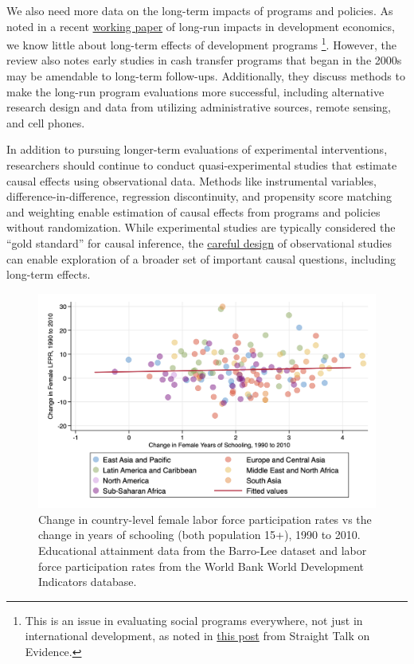 \documentclass[11pt]{article}
\begin{document}

We also need more data on the long-term impacts of programs and policies. As noted in a recent \href{https://www.nber.org/papers/w25356}{working paper} of long-run impacts in development economics, we know little about long-term effects of development programs \footnote{This is an issue in evaluating social programs everywhere, not just in international development, as noted in  \href{texthttps://www.straighttalkonevidence.org/2019/04/03/beware-the-pitfalls-of-short-term-program-effects-they-often-fade/}{this post} from Straight Talk on Evidence.}. However, the review also notes early studies in cash transfer programs that began in the 2000s may be amendable to long-term follow-ups. Additionally, they discuss methods to make the long-run program evaluations more successful, including alternative research design and data from utilizing administrative sources, remote sensing, and cell phones.


In addition to pursuing longer-term evaluations of experimental interventions, researchers should continue to conduct quasi-experimental studies that estimate causal effects using observational data. Methods like instrumental variables, difference-in-difference, regression discontinuity, and propensity score matching and weighting enable estimation of causal effects from programs and policies without randomization. While experimental studies are typically considered the ``gold standard'' for causal inference, the \href{https://onlinelibrary.wiley.com/doi/abs/10.1002/sim.2739}{careful design} of observational studies can enable exploration of a broader set of important causal questions, including long-term effects.

\begin{figure}
	\centering
	\includegraphics[width=0.9 \linewidth]{LFPRF_yrsch.png}
	\caption{\small Change in country-level female labor force participation rates vs the change in years of schooling (both population 15+), 1990 to 2010. Educational attainment data from the Barro-Lee dataset and labor force participation rates from the World Bank World Development Indicators database. }
	\label{fig:LFPRFyrsch}
\end{figure}
\end{document}
